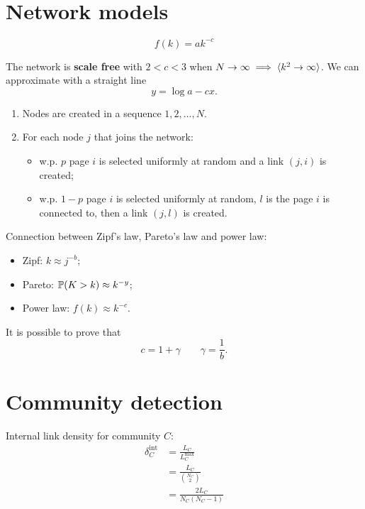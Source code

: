 \documentclass[a4paper,9pt]{extarticle}
\begin{document}
\begin{multicols*}{2}
\section{Network models}
\begin{riquadro}
	\begin{equation*}
		f(k)=ak^{-c}
	\end{equation*}
\end{riquadro}
	The network is \textbf{scale free} with $2<c<3$ when $N\to\infty\implies \langle k^{2}\to\infty \rangle$. We can approximate with a straight line
\begin{equation*}
	y=\log a-cx.
\end{equation*}
\begin{riquadro}
	\begin{enumerate}
		\item Nodes are created in a sequence $1,2,\ldots,N$.
		\item For each node $j$ that joins the network:
		\begin{itemize}
			\item w.p. $p$ page $i$ is selected uniformly at random and a link $(j,i)$ is created;
			\item w.p. $1-p$ page $i$ is selected uniformly at random, $l$ is the page $i$ is connected to, then a link $(j,l)$ is created.
		\end{itemize}
	\end{enumerate}
\end{riquadro}
Connection between Zipf's law, Pareto's law and power law:
\begin{itemize}
	\item Zipf: $k\approx j^{-b}$;
	\item Pareto: $\mathbb{P}(K>k)\approx k^{-y}$;
	\item Power law: $f(k)\approx k^{-c}$.
\end{itemize}
It is possible to prove that 
\begin{equation*}
	c=1+\gamma\qquad\gamma=\frac{1}{b}.
\end{equation*}
	\section{Community detection}
	Internal link density for community $C$:
	\begin{align*}
		\delta^{\mathrm{int}}_{C}&=\frac{L_{C}}{L_{C}^{\max}}\\
		&=\frac{L_{C}}{{N_{C}\choose 2}}\\
		&=\frac{2L_{C}}{N_{C}(N_{C}-1)}
	\end{align*}

\end{multicols*}
\end{document}

